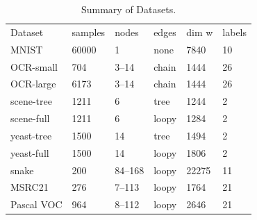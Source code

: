 \begin{table}
    \caption{Summary of Datasets.}
    \begin{tabu} to 
    \toprule
    Dataset    & {samples} & nodes & edges & {dim w} & {labels}\\
    MNIST      & 60000   & 1     & none  & 7840  & 10\\
    OCR-small  & 704     & 3--14 & chain & 1444  & 26\\
    OCR-large  & 6173    & 3--14 & chain & 1444  & 26\\
    scene-tree & 1211    & 6     & tree  & 1244  & 2\\
    scene-full & 1211    & 6     & loopy & 1284  & 2\\
    yeast-tree & 1500    & 14    & tree  & 1494  & 2\\
    yeast-full & 1500    & 14    & loopy & 1806  & 2\\
    snake      & 200     &84--168& loopy & 22275 & 11\\
    MSRC21     & 276     & 7--113& loopy &  1764 & 21\\
    Pascal VOC & 964     & 8--112& loopy &  2646 & 21\\
    \bottomrule

    \end{tabu}
\end{table}

